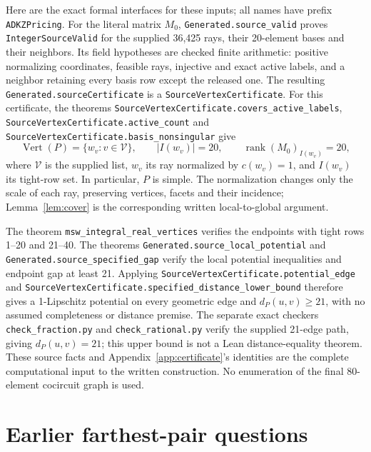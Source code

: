 \documentclass[11pt]{article}
\theoremstyle{remark}
\begin{document}
\begin{appendices}
Here are the exact formal interfaces for these inputs; all names have
prefix \nolinkurl{ADKZPricing}.
For the literal matrix $M_0$, \nolinkurl{Generated.source_valid} proves
\nolinkurl{IntegerSourceValid} for the supplied 36,425 rays, their
20-element bases and their neighbors. Its field hypotheses are checked
finite arithmetic: positive normalizing coordinates, feasible rays,
injective and exact active labels, and a neighbor retaining every basis
row except the released one. The resulting
\nolinkurl{Generated.sourceCertificate} is a
\nolinkurl{SourceVertexCertificate}.
For this certificate, the theorems
\nolinkurl{SourceVertexCertificate.covers_active_labels},
\nolinkurl{SourceVertexCertificate.active_count} and
\nolinkurl{SourceVertexCertificate.basis_nonsingular} give
\[
 \operatorname{Vert}(P)=\{w_v:v\in\mathcal V\},\qquad
 |I(w_v)|=20,\qquad
 \operatorname{rank}(M_0)_{I(w_v)}=20,
\]
where $\mathcal V$ is the supplied list, $w_v$ its ray normalized by
$c(w_v)=1$, and $I(w_v)$ its tight-row set. In particular, $P$ is simple.
The normalization changes only the scale of each ray, preserving vertices,
facets and their incidence; Lemma~\ref{lem:cover} is the corresponding
written local-to-global argument.

The theorem \nolinkurl{msw_integral_real_vertices} verifies the endpoints
with tight rows 1--20 and 21--40.
The theorems \nolinkurl{Generated.source_local_potential} and
\nolinkurl{Generated.source_specified_gap} verify the local potential
inequalities and endpoint gap at least 21.
Applying \nolinkurl{SourceVertexCertificate.potential_edge} and
\nolinkurl{SourceVertexCertificate.specified_distance_lower_bound}
therefore gives a 1-Lipschitz potential on every geometric edge and
$d_P(u,v)\ge21$, with no assumed completeness or distance premise.
The separate exact checkers \texttt{check\_fraction.py} and
\texttt{check\_rational.py} verify the supplied 21-edge path, giving
$d_P(u,v)=21$; this upper bound is not a Lean distance-equality theorem.
These source facts and Appendix~\ref{app:certificate}'s identities are
the complete computational input to the written construction.
No enumeration of the final 80-element cocircuit graph is used.

\section{Earlier farthest-pair questions}


\end{appendices}
\end{document}
